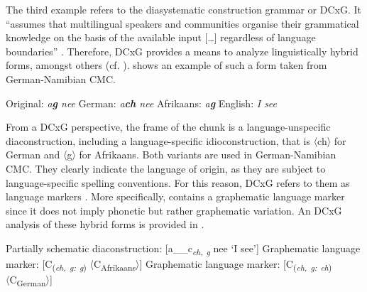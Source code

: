 \documentclass[output=paper]{langsci/langscibook}
\begin{document}
The third example refers to the diasystematic construction grammar or DCxG. It “assumes that multilingual speakers and communities organise their grammatical knowledge on the basis of the available input […] regardless of language boundaries” \citep[2]{hoder_grammar_2018}. Therefore, DCxG provides a means to analyze linguistically hybrid forms, amongst others (cf. \citealt[23]{hoder_mehrsprachige_2018}).  shows an example of such a form taken from German-Namibian CMC.

\ea
\label{ex:radke:1}
	\ea \label{ex:radke:1a} Original: \textit{a\textbf{g} nee} 
	\ex \label{ex:radke:1b} German: \textit{a\textbf{ch} nee}
	\ex \label{ex:radke:1c} Afrikaans: \textit{a\textbf{g}}
	\ex \label{ex:radke:1d} English: \textit{I see}
\z
\z

From a DCxG perspective, the frame of the chunk is a language-unspecific diaconstruction, including a language-specific idioconstruction, that is 〈ch〉 for German and 〈g〉 for Afrikaans. Both variants are used in German-Namibian CMC. They clearly indicate the language of origin, as they are subject to language-specific spelling conventions. For this reason, DCxG refers to them as language markers \citep[23]{hoder_mehrsprachige_2018}. More specifically,  contains a graphematic language marker since it does not imply phonetic but rather graphematic variation. An DCxG analysis of these hybrid forms is provided in .

\ea
\label{ex:radke:2}
 	\ea \label{ex:radke:2a} 
 	Partially schematic diaconstruction: {[}a\_\_c\textit{\textsubscript{ch,}} \textit{\textsubscript{g}} nee ‘I see’{]}
	\ex \label{ex:radke:2b}
 	Graphematic language marker: {[}C\textsubscript{(}\textit{\textsubscript{ch,} \textit{\textsubscript{g:}} \textit{\textsubscript{g}}}\textsubscript{)} 〈C\textsubscript{Afrikaans}〉{]}
	\ex\label{ex:radke:}
 	Graphematic language marker: {[}C\textsubscript{(}\textit{\textsubscript{ch,} \textit{\textsubscript{g:}} \textit{\textsubscript{ch}}}\textsubscript{)} 〈C\textsubscript{German}〉{]} 
\z
\z
\end{document}
